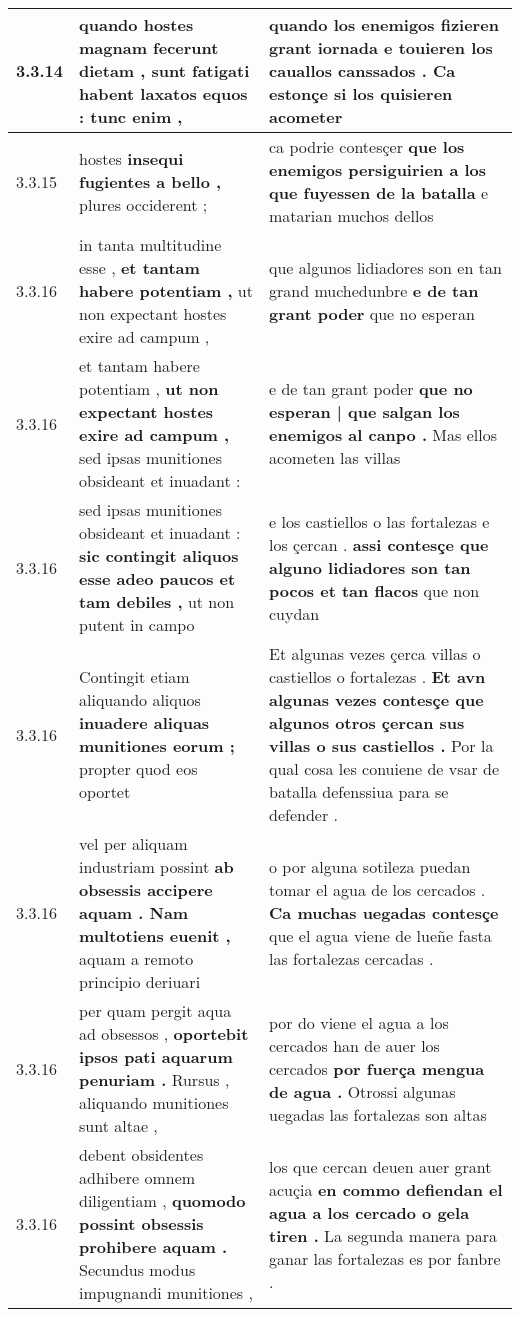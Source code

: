\begin{tabular}{|p{1cm}|p{6.5cm}|p{6.5cm}|}
3.3.14 & quando hostes magnam fecerunt dietam , \textbf{ sunt fatigati habent laxatos equos : } tunc enim , & quando los enemigos fizieren grant iornada \textbf{ e touieren los cauallos canssados . } Ca estonçe si los quisieren acometer \\\hline
3.3.15 & hostes \textbf{ insequi fugientes a bello , } plures occiderent ; & ca podrie contesçer \textbf{ que los enemigos persiguirien a los que fuyessen de la batalla } e matarian muchos dellos \\\hline
3.3.16 & in tanta multitudine esse , \textbf{ et tantam habere potentiam , } ut non expectant hostes exire ad campum , & que algunos lidiadores son en tan grand muchedunbre \textbf{ e de tan grant poder } que no esperan \\\hline
3.3.16 & et tantam habere potentiam , \textbf{ ut non expectant hostes exire ad campum , } sed ipsas munitiones obsideant et inuadant : & e de tan grant poder \textbf{ que no esperan | que salgan los enemigos al canpo . } Mas ellos acometen las villas \\\hline
3.3.16 & sed ipsas munitiones obsideant et inuadant : \textbf{ sic contingit aliquos esse adeo paucos et tam debiles , } ut non putent in campo & e los castiellos o las fortalezas e los çercan . \textbf{ assi contesçe que alguno lidiadores son tan pocos et tan flacos } que non cuydan \\\hline
3.3.16 & Contingit etiam aliquando aliquos \textbf{ inuadere aliquas munitiones eorum ; } propter quod eos oportet & Et algunas vezes çerca villas o castiellos o fortalezas . \textbf{ Et avn algunas vezes contesçe que algunos otros çercan sus villas o sus castiellos . } Por la qual cosa les conuiene de vsar de batalla defenssiua para se defender . \\\hline
3.3.16 & vel per aliquam industriam possint \textbf{ ab obsessis accipere aquam . Nam multotiens euenit , } aquam a remoto principio deriuari & o por alguna sotileza puedan tomar el agua de los cercados . \textbf{ Ca muchas uegadas contesçe } que el agua viene de lueñe fasta las fortalezas cercadas . \\\hline
3.3.16 & per quam pergit aqua ad obsessos , \textbf{ oportebit ipsos pati aquarum penuriam . } Rursus , aliquando munitiones sunt altae , & por do viene el agua a los cercados han de auer los cercados \textbf{ por fuerça mengua de agua . } Otrossi algunas uegadas las fortalezas son altas \\\hline
3.3.16 & debent obsidentes adhibere omnem diligentiam , \textbf{ quomodo possint obsessis prohibere aquam . } Secundus modus impugnandi munitiones , & los que cercan deuen auer grant acuçia \textbf{ en commo defiendan el agua a los cercado o gela tiren . } La segunda manera para ganar las fortalezas es por fanbre . \\\hline

\end{tabular}

